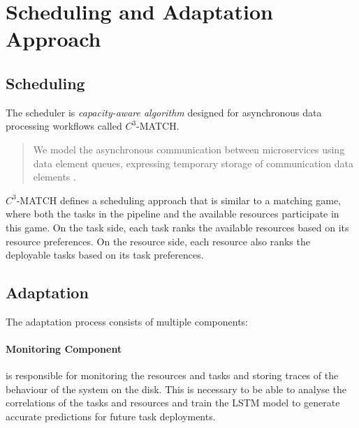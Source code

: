   



  

\section{Scheduling and Adaptation Approach}
\label{sec:scheduling-and-adaptation-approach-architecture}

  \subsection{Scheduling}
  \label{sec:scheduling-saa-background}

    The scheduler is \emph{capacity-aware algorithm} designed for asynchronous data processing workflows called $C^3$-MATCH.

    \begin{quote}
        We model the asynchronous communication between microservices using data element queues, expressing temporary storage of communication data elements \cite{mehranMatchingbasedSchedulingAsynchronous2022}.
    \end{quote}

    $C^3$-MATCH defines a scheduling approach that is similar to a matching game, where both the tasks in the pipeline and the available resources participate in this game.
    On the task side, each task ranks the available resources based on its resource preferences.
    On the resource side, each resource also ranks the deployable tasks based on its task preferences.

  \subsection{Adaptation}
  \label{sec:adaptation-saa-background}

      The adaptation process consists of multiple components:

      \paragraph{Monitoring Component } is responsible for monitoring the resources and tasks and storing traces of the behaviour of the system on the disk.
      This is necessary to be able to analyse the correlations of the tasks and resources and train the LSTM model to generate accurate predictions for future task deployments.

